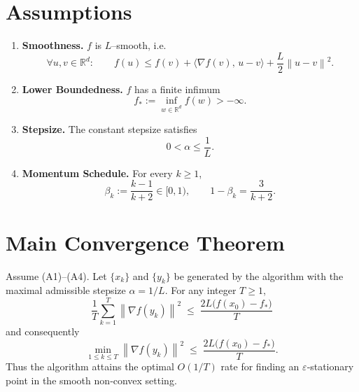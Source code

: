 \documentclass{article}
\newcommand{\norm}[1]{\left\lVert#1\right\rVert}
\newcommand{\grad}{\nabla}
\begin{document}
\section*{Assumptions}
\begin{enumerate}[label={A\arabic*}:, leftmargin=*]
\item \textbf{Smoothness.} $f$ is $L$–smooth, i.e.
\[
\forall u,v\in\mathbb{R}^d:\qquad
f(u)\le f(v)+\langle\grad f(v),\,u-v\rangle+\frac{L}{2}\norm{u-v}^2 .
\tag{A1}
\]
\item \textbf{Lower Boundedness.} $f$ has a finite infimum
\[
f_*:=\inf_{w\in\mathbb{R}^d}f(w)>-\infty .
\tag{A2}
\]
\item \textbf{Stepsize.} The constant stepsize satisfies
\[
0<\alpha\le \frac{1}{L}.
\tag{A3}
\]
\item \textbf{Momentum Schedule.} For every $k\ge 1$,
\[
\beta_k:=\frac{k-1}{k+2}\in[0,1),
\qquad
1-\beta_k=\frac{3}{k+2}.
\tag{A4}
\]
\end{enumerate}

\section*{Main Convergence Theorem}
\begin{theorem}\label{thm:main}
Assume (A1)–(A4).  Let $\{x_k\}$ and $\{y_k\}$ be generated by the algorithm
with the maximal admissible stepsize $\alpha=1/L$.  For any integer $T\ge 1$,
\[
\boxed{
\frac{1}{T}\sum_{k=1}^{T}\norm{\grad f(y_k)}^{2}
\;\le\;
\frac{2L\bigl(f(x_{0})-f_*\bigr)}{T}
}
\tag{1}
\]
and consequently
\[
\min_{1\le k\le T}\norm{\grad f(y_k)}^{2}
\;\le\;
\frac{2L\bigl(f(x_{0})-f_*\bigr)}{T}.
\tag{2}
\]
Thus the algorithm attains the optimal $O(1/T)$ rate for finding an
$\varepsilon$‑stationary point in the smooth non‑convex setting.
\end{theorem}

\end{document}
